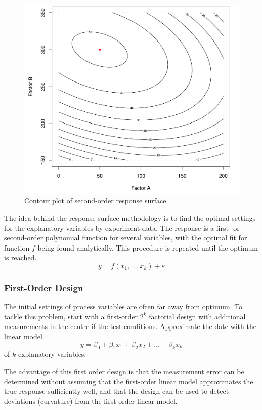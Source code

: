 \documentclass[11pt]{article}
\theoremstyle{definition}
\begin{document}
\begin{figure}[tbh]
	\centering
	\includegraphics[width=0.6\linewidth]{img/contour_plot_second_order_response_surface}
	\caption{Contour plot of second-order response surface}
	\label{fig:contourplotsecondorderresponsesurface}
\end{figure}

The idea behind the response surface methodology is to find the optimal settings for the explanatory variables by experiment data. The response is a first- or second-order polynomial function for several variables, with the optimal fit for function $f$ being found analytically. This procedure is repeated until the optimum is reached.
\begin{equation*} 
	y=f(x_1,\dots,x_k) + \varepsilon \tag{fit response function}
\end{equation*}

\subsubsection{First-Order Design}
The initial settings of process variables are often far away from optimum. To tackle this problem, start with a first-order $2^k$ factorial design with additional measurements in the centre if the test conditions. Approximate the date with the linear model
\begin{equation*}
	y = \beta_0 + \beta_1 x_1 + \beta_2 x_2 + \dots + \beta_k x_k
\end{equation*}
of $k$ explanatory variables.

The advantage of this first order design is that the measurement error can be determined without assuming that the first-order linear model approximates the true response sufficiently well, and that the design can be used to detect deviations (curvature) from the first-order linear model.
\end{document}
